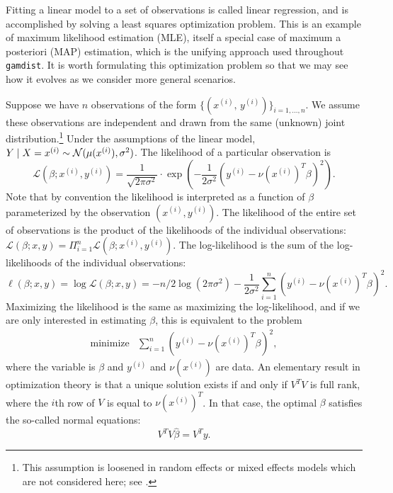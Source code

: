 \documentclass[12pt]{article}
\begin{document}
Fitting a linear model to a set of observations is called linear regression, and is accomplished by solving a least squares optimization problem. This is an example of maximum likelihood estimation (MLE), itself a special case of maximum a posteriori (MAP) estimation, which is the unifying approach used throughout \texttt{gamdist}. It is worth formulating this optimization problem so that we may see how it evolves as we consider more general scenarios.

Suppose we have $n$ observations of the form $\{ (x^{(i)}, \,y^{(i)} ) \}_{i=1, \ldots, n}$. We assume these observations are independent and drawn from the same (unknown) joint distribution.\footnote{This assumption is loosened in random effects or mixed effects models which are not considered here; see \cite{Stroup:2012}.} Under the assumptions of the linear model, $Y \; | \; X = x^{(i)} \sim {\mathcal N} (\mu(x^{(i)}), \sigma^2)$. The likelihood of a particular observation is
\begin{displaymath}
    \mathcal{L}(\beta; x^{(i)}, y^{(i)}) = \frac{1}{\sqrt{2\pi \sigma^2}} \cdot \exp\left( -\frac{1}{2 \sigma^2} \left(y^{(i)} - \nu \left( x^{(i)} \right)^T \beta \right)^2 \right).
\end{displaymath}
Note that by convention the likelihood is interpreted as a function of $\beta$ parameterized by the observation $(x^{(i)}, y^{(i)})$. The likelihood of the entire set of observations is the product of the likelihoods of the individual observations: $\mathcal{L}(\beta; x, y) = \Pi_{i=1}^n \mathcal{L}(\beta; x^{(i)}, y^{(i)})$. The log-likelihood is the sum of the log-likelihoods of the individual observations:
\begin{displaymath}
   \ell(\beta; x, y) = \log \mathcal{L}(\beta; x, y) = -n/2 \log(2\pi \sigma^2) - \frac{1}{2\sigma^2} \sum_{i=1}^n \left( y^{(i)} - \nu \left(x^{(i)} \right)^T \beta \right)^2.
\end{displaymath}
Maximizing the likelihood is the same as maximizing the log-likelihood, and if we are only interested in estimating $\beta$, this is equivalent to the problem
\begin{displaymath}
        \begin{array}{ll}
            \mbox{minimize} & {\displaystyle \sum_{i=1}^n} \left( y^{(i)} - \nu \left(x^{(i)} \right)^T \beta \right)^2,
        \end{array}
\end{displaymath}
where the variable is $\beta$ and $y^{(i)}$ and $\nu(x^{(i)})$ are data. An elementary result in optimization theory is that a unique solution exists if and only if $V^T V$ is full rank, where the $i$th row of $V$ is equal to $\nu(x^{(i)})^T$. In that case, the optimal $\beta$ satisfies the so-called normal equations:
\begin{displaymath}
    V^T V \hat{\beta} = V^T  y.
\end{displaymath}
\end{document}
